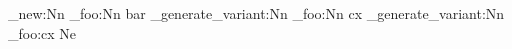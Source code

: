 \cs_new:Nn
  \module_foo:Nn
  { bar }
\cs_generate_variant:Nn
  \module_foo:Nn
  { cx }
\cs_generate_variant:Nn  %
  \module_foo:cx
  { Ne }
